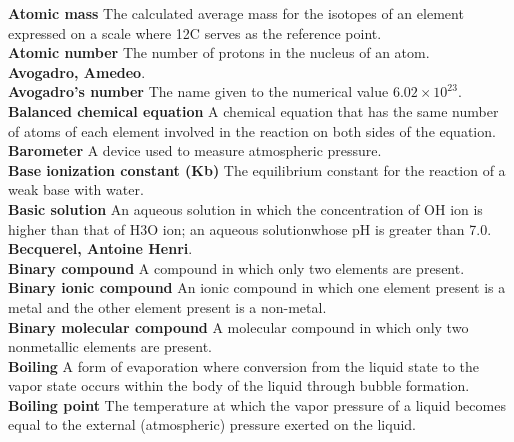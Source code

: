 \documentclass[10pt, roman]{article}
\begin{document}
\begin{minipage}[c]{0.30\textwidth}
\textbf{Atomic mass} The calculated average mass for the isotopes of an element expressed on a scale where 12C serves as the reference point. \\
\textbf{Atomic number} The number of protons in the nucleus of an atom. \\
\textbf{Avogadro, Amedeo}. \\
\textbf{Avogadro’s number} The name given to the numerical value $6.02 \times 10^{23}$. \\
\textbf{Balanced chemical equation} A chemical equation that has the same number of atoms of each element involved in the reaction on both sides of the equation. \\
\textbf{Barometer} A device used to measure atmospheric pressure. \\
\textbf{Base ionization constant (Kb)} The equilibrium constant for the reaction of a weak base with water. \\
\textbf{Basic solution} An aqueous solution in which the concentration of OH ion is higher than that of H3O ion; an aqueous solutionwhose pH is greater than 7.0. \\
\textbf{Becquerel, Antoine Henri}. \\
\textbf{Binary compound} A compound in which only two elements are present. \\
\textbf{Binary ionic compound} An ionic compound in which one element present is a metal and the other element present is a non-metal. \\
\textbf{Binary molecular compound} A molecular compound in which only two nonmetallic elements are present. \\
\textbf{Boiling} A form of evaporation where conversion from the liquid state to the vapor state occurs within the body of the liquid through bubble formation. \\
\textbf{Boiling point} The temperature at which the vapor pressure of a liquid becomes equal to the external (atmospheric) pressure exerted on the liquid. \\
\end{minipage}%
\hfill
\end{document}

